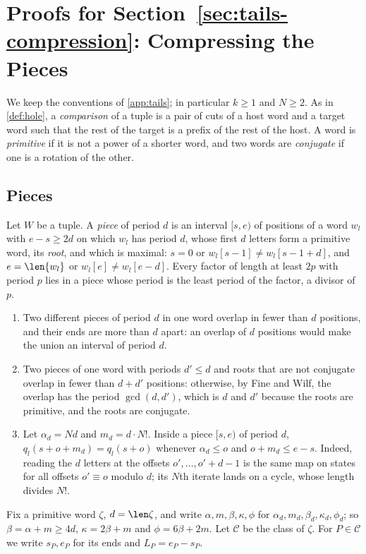 \section{Proofs for Section~\ref{sec:tails-compression}: Compressing the Pieces}
\label{app:compression}

We keep the conventions of \cref{app:tails}; in particular $k\ge1$ and
$N\ge2$. As in \cref{def:hole}, a \emph{comparison} of a tuple is a pair of
cuts of a host word and a target word such that the rest of the target is a
prefix of the rest of the host. A word
is \emph{primitive} if it is not a power of a shorter word, and two words
are \emph{conjugate} if one is a rotation of the other.

\subsection{Pieces}\label{app:compression-pieces}

Let $W$ be a tuple. A \emph{piece} of period $d$ is an interval $[s,e)$ of
positions of a word $w_l$ with $e-s\ge2d$ on which $w_l$ has period $d$,
whose first $d$ letters form a primitive word, its \emph{root}, and which is
maximal: $s=0$ or $w_l[s-1]\ne w_l[s-1+d]$, and $e=\len{w_l}$ or
$w_l[e]\ne w_l[e-d]$. Every factor of length at least $2p$ with period $p$
lies in a piece whose period is the least period of the factor, a divisor of
$p$.
\begin{enumerate}[label=\textup{(P\arabic*)}]
\item\label{it:P1} Two different pieces of period $d$ in one word overlap in
  fewer than $d$ positions, and their ends are more than $d$ apart: an
  overlap of $d$ positions would make the union an interval of period $d$.
\item\label{it:P2} Two pieces of one word with periods $d'\le d$ and roots
  that are not conjugate overlap in fewer than $d+d'$ positions: otherwise,
  by Fine and Wilf, the overlap has the period $\gcd(d,d')$, which is $d$
  and $d'$ because the roots are primitive, and the roots are conjugate.
\item\label{it:P3} Let $\alpha_d=Nd$ and $m_d=d\cdot N!$. Inside a piece
  $[s,e)$ of period $d$, $q_l(s+o+m_d)=q_l(s+o)$ whenever $\alpha_d\le o$ and
  $o+m_d\le e-s$. Indeed, reading the $d$ letters at the offsets
  $o',\dots,o'+d-1$ is the same map on states for all offsets $o'\equiv o$
  modulo $d$; its $N$th iterate lands on a cycle, whose length divides $N!$.
\end{enumerate}
Fix a primitive word $\zeta$, $d=\len\zeta$, and write
$\alpha,m,\beta,\kappa,\phi$ for $\alpha_d,m_d,\beta_d,\kappa_d,\phi_d$; so
$\beta=\alpha+m\ge4d$, $\kappa=2\beta+m$ and $\phi=6\beta+2m$. Let
$\mathcal C$ be the class of $\zeta$. For $P\in\mathcal C$ we write
$s_P,e_P$ for its ends and $L_P=e_P-s_P$.

